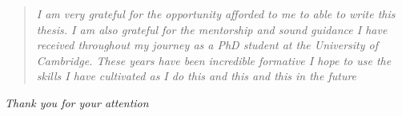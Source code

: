\pagebreak
\hspace{0pt}
\vspace*{\fill}
\begin{quote}\emph{
I am very grateful for the opportunity afforded to me to able to write this thesis.
I am also grateful for the mentorship and sound guidance I have received throughout my journey as a PhD student at the University of Cambridge.
These years have been incredible formative
I hope to use the skills I have cultivated as I do this and this and this in the future
}
\end{quote}
\mbox{}\hfill \emph{Thank you for your attention}
\vspace*{\fill}
\hspace{0pt}
